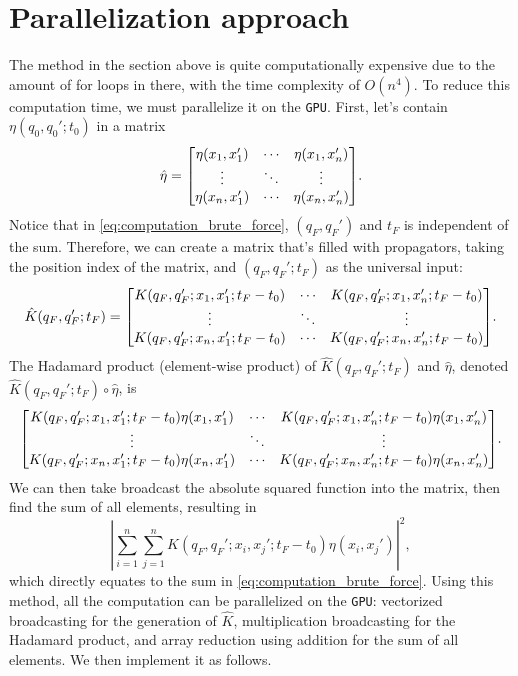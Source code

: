 \section{Parallelization approach}

The method in the section above is quite computationally expensive due to the amount of for loops in there, with the time complexity of $O(n^4)$. To reduce this computation time, we must parallelize it on the \texttt{GPU}. First, let's contain $\eta(q_0, q_0'; t_0)$ in a matrix
\begin{equation}
    \hat{\eta} = \mqty[
        \eta(x_1, x_1') & \cdots & \eta(x_1, x_n') \\
        \vdots & \ddots & \vdots \\
        \eta(x_n, x_1') & \cdots & \eta(x_n, x_n') 
    ].
\end{equation}
Notice that in \cref{eq:computation_brute_force}, $(q_F, q_F')$ and $t_F$ is independent of the sum. Therefore, we can create a matrix that's filled with propagators, taking the position index of the matrix, and $(q_F, q_F'; t_F)$ as the universal input:
\begin{equation}
    \hat{K}(q_F, q_F'; t_F) = \mqty[
        K(q_F, q_F'; x_1, x_1'; t_F - t_0) & \cdots & K(q_F, q_F'; x_1, x_n'; t_F - t_0) \\
        \vdots & \ddots & \vdots \\
        K(q_F, q_F'; x_n, x_1'; t_F - t_0) & \cdots & K(q_F, q_F'; x_n, x_n'; t_F - t_0)
    ].
\end{equation}
The Hadamard product (element-wise product) of $\hat{K}(q_F, q_F'; t_F)$ and $\hat{\eta}$, denoted $\hat{K}(q_F, q_F'; t_F) \circ \hat{\eta}$, is
\begin{equation}
    \mqty[
        K(q_F, q_F'; x_1, x_1'; t_F - t_0)\eta(x_1, x_1') & \cdots & K(q_F, q_F'; x_1, x_n'; t_F - t_0)\eta(x_1, x_n') \\
        \vdots & \ddots & \vdots \\
        K(q_F, q_F'; x_n, x_1'; t_F - t_0)\eta(x_n, x_1') & \cdots & K(q_F, q_F'; x_n, x_n'; t_F - t_0)\eta(x_n, x_n')
    ].
\end{equation}
We can then take broadcast the absolute squared function into the matrix, then find the sum of all elements, resulting in
\begin{equation}
    \left|\sum_{i = 1}^{n}\sum_{j = 1}^n K(q_F, q_F'; x_i, x_j'; t_F - t_0)\eta(x_i, x_j')\right|^2,
\end{equation}
which directly equates to the sum in \cref{eq:computation_brute_force}. Using this method, all the computation can be parallelized on the \texttt{GPU}: vectorized broadcasting for the generation of $\hat{K}$, multiplication broadcasting for the Hadamard product, and array reduction using addition for the sum of all elements. We then implement it as follows.
